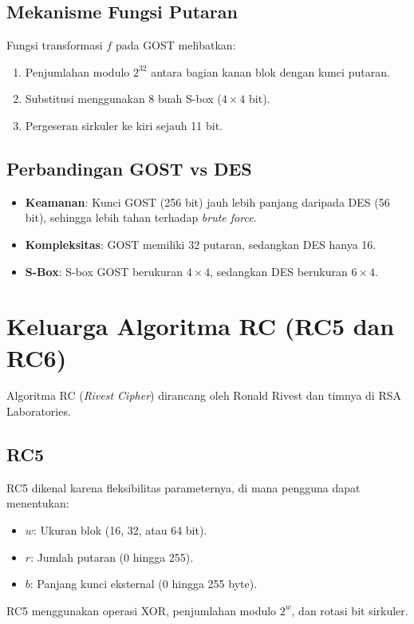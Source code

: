 \documentclass[../main.tex]{subfiles}
\begin{document}
\subsection{Mekanisme Fungsi Putaran}
Fungsi transformasi $f$ pada GOST melibatkan:
\begin{enumerate}
    \item Penjumlahan modulo $2^{32}$ antara bagian kanan blok dengan kunci putaran.
    \item Substitusi menggunakan 8 buah S-box ($4 \times 4$ bit).
    \item Pergeseran sirkuler ke kiri sejauh 11 bit.
\end{enumerate}

\subsection{Perbandingan GOST vs DES}
\begin{itemize}
    \item \textbf{Keamanan}: Kunci GOST (256 bit) jauh lebih panjang daripada DES (56 bit), sehingga lebih tahan terhadap \textit{brute force}.
    \item \textbf{Kompleksitas}: GOST memiliki 32 putaran, sedangkan DES hanya 16.
    \item \textbf{S-Box}: S-box GOST berukuran $4 \times 4$, sedangkan DES berukuran $6 \times 4$.
\end{itemize}

\section{Keluarga Algoritma RC (RC5 dan RC6)}
Algoritma RC (\textit{Rivest Cipher}) dirancang oleh Ronald Rivest dan timnya di RSA Laboratories.

\subsection{RC5}
RC5 dikenal karena fleksibilitas parameternya, di mana pengguna dapat menentukan:
\begin{itemize}
    \item $w$: Ukuran blok (16, 32, atau 64 bit).
    \item $r$: Jumlah putaran (0 hingga 255).
    \item $b$: Panjang kunci eksternal (0 hingga 255 byte).
\end{itemize}
RC5 menggunakan operasi XOR, penjumlahan modulo $2^w$, dan rotasi bit sirkuler.
\end{document}
